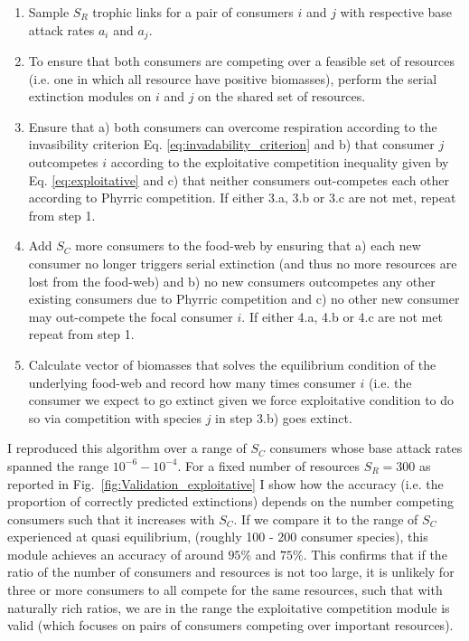 \documentclass[a4paper]{report}
\begin{document}
\begin{enumerate}

\item Sample $S_R$ trophic links for a pair of consumers $i$ and $j$ with respective base attack rates $a_i$ and $a_j$.

\item To ensure that both consumers are competing over a feasible set of resources (i.e. one in which all resource have positive biomasses), perform the serial extinction modules on $i$ and $j$ on the shared set of resources. 

\item Ensure that a) both consumers can overcome respiration according to the invasibility criterion Eq. \eqref{eq:invadability_criterion} and b) that consumer $j$ outcompetes $i$ according to the exploitative competition inequality given by Eq. \eqref{eq:exploitative} and c) that neither consumers out-competes each other according to Phyrric competition. If either 3.a, 3.b or 3.c are not met, repeat from step 1.

\item Add $S_C$ more consumers to the food-web by ensuring that a) each new consumer no longer triggers serial extinction (and thus no more resources are lost from the food-web) and b) no new consumers outcompetes any other existing consumers due to Phyrric competition and c) no other new consumer may out-compete the focal consumer $i$. If either 4.a, 4.b or 4.c are not met repeat from step 1.

\item Calculate vector of biomasses that solves the equilibrium condition of the underlying food-web and record how many times consumer $i$ (i.e. the consumer we expect to go extinct given we force exploitative condition to do so via competition with species $j$ in step 3.b) goes extinct.
\end{enumerate}

I reproduced this algorithm over a range of $S_C$ consumers whose base attack rates spanned the range $10^{-6}-10^{-4}$. For a fixed number of resources $S_R=300$ as reported in Fig.~\ref{fig:Validation_exploitative} I show how the  accuracy (i.e. the proportion of correctly predicted extinctions) depends on the number competing consumers such that it increases with $S_C$. If we compare it to the range of $S_C$ experienced at quasi equilibrium, (roughly 100 - 200 consumer species), this module achieves an accuracy of around $95\%$ and $75\%$. This confirms that if the ratio of the number of consumers and resources is not too large, it is unlikely for three or more consumers to all compete for the same resources, such that with naturally rich ratios, we are in the range the exploitative competition module is valid (which focuses on pairs of consumers competing over important resources).
\end{document}
